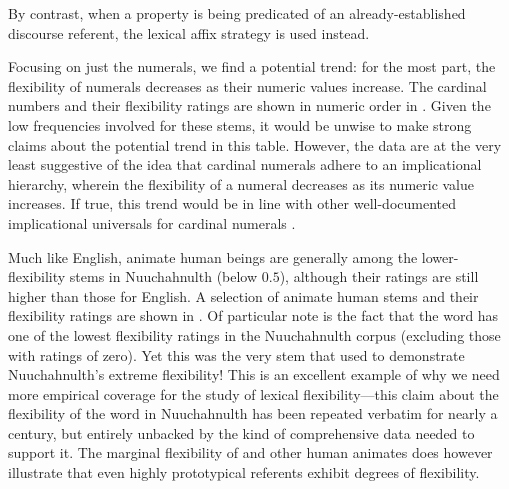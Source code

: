 
\noindent By contrast, when a property is being predicated of an already-established discourse referent, the lexical affix strategy is used instead.

Focusing on just the numerals, we find a potential trend: for the most part, the flexibility of numerals decreases as their numeric values increase. The cardinal numbers and their flexibility ratings are shown in numeric order in . Given the low frequencies involved for these stems, it would be unwise to make strong claims about the potential trend in this table. However, the data are at the very least suggestive of the idea that cardinal numerals adhere to an implicational hierarchy, wherein the flexibility of a numeral decreases as its numeric value increases. If true, this trend would be in line with other well-documented implicational universals for cardinal numerals \parencites{DehaeneMiller1992}[141]{Croft2003} .


Much like English, animate human beings are generally among the lower-flexibility stems in Nuuchahnulth (below $0.5$), although their ratings are still higher than those for English. A selection of animate human stems and their flexibility ratings are shown in . Of particular note is the fact that the word   has one of the lowest flexibility ratings in the Nuuchahnulth corpus (excluding those with ratings of zero). Yet this was the very stem that \textcite{Swadesh1939b} used to demonstrate Nuuchahnulth's extreme flexibility! This is an excellent example of why we need more empirical coverage for the study of lexical flexibility—this claim about the flexibility of the word  in Nuuchahnulth has been repeated verbatim for nearly a century, but entirely unbacked by the kind of comprehensive data needed to support it. The marginal flexibility of  and other human animates does however illustrate that even highly prototypical referents exhibit degrees of flexibility.


